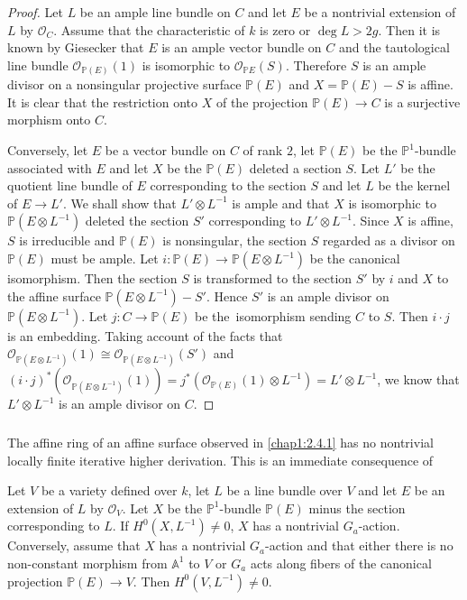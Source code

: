 \begin{proof}
Let $L$ be an ample line bundle on $C$ and let $E$ be a nontrivial
extension of $L$ by $\mathscr{O}_{C}$. Assume that the characteristic
of $k$ is zero or $\deg L>2g$. Then it is known by Giesecker \cite{15}
that $E$ is an ample vector bundle on $C$ and the tautological line
bundle $\mathscr{O}_{\mathbb{P}(E)}(1)$ is isomorphic to
$\mathscr{O}_{\mathbb{P}E}(S)$. Therefore $S$ is an ample divisor on
a nonsingular projective surface $\mathbb{P}(E)$ and
$X=\mathbb{P}(E)-S$ is affine. It is clear that the restriction onto
$X$ of the projection $\mathbb{P}(E)\to C$ is a surjective morphism
onto $C$. 

Conversely, let $E$ be a vector bundle on $C$ of rank $2$, let
$\mathbb{P}(E)$ be the $\mathbb{P}^{1}$-bundle associated with $E$ and
let $X$ be the $\mathbb{P}(E)$ deleted a section $S$. Let $L'$ be the
quotient line bundle of $E$ corresponding to the section $S$ and let
$L$ be the kernel of $E\to L'$. We shall show that $L'\otimes L^{-1}$
is ample and that $X$ is isomorphic to $\mathbb{P}(E\otimes L^{-1})$
deleted the section $S'$ corresponding to $L'\otimes L^{-1}$. Since
$X$ is affine, $S$ is irreducible and $\mathbb{P}(E)$ is nonsingular,
the section $S$ regarded as a divisor on $\mathbb{P}(E)$ must be
ample. Let $i:\mathbb{P}(E)\to \mathbb{P}(E\otimes L^{-1})$ be the
canonical isomorphism. Then the section $S$ is transformed to the
section $S'$ by $i$ and $X$ to the affine surface $\mathbb{P}(E\otimes
L^{-1})-S'$. Hence $S'$ is an ample divisor on $\mathbb{P}(E\otimes
L^{-1})$. Let $j:C\to \mathbb{P}(E)$ be the\pageoriginale\ isomorphism
sending $C$ to $S$. Then $i\cdot j$ is an embedding. Taking account of
the facts that $\mathscr{O}_{\mathbb{P}(E\otimes L^{-1})}(1)\cong
\mathscr{O}_{\mathbb{P}(E\otimes L^{-1})}(S')$ and $(i\cdot
j)^{\ast}(\mathscr{O}_{\mathbb{P}(E\otimes
  L^{-1})}(1))=j^{\ast}(\mathscr{O}_{\mathbb{P}(E)}(1)\otimes
L^{-1})=L'\otimes L^{-1}$, we know that $L'\otimes L^{-1}$ is an ample
divisor on $C$.
\end{proof}

\subsubsection{}\label{chap1:2.4.2}
The affine ring of an affine surface observed in \ref{chap1:2.4.1} has no
nontrivial locally finite iterative higher derivation. This is an
immediate consequence of

\begin{lemma*}
Let $V$ be a variety defined over $k$, let $L$ be a line bundle over
$V$ and let $E$ be an extension of $L$ by $\mathscr{O}_{V}$. Let $X$
be the $\mathbb{P}^{1}$-bundle $\mathbb{P}(E)$ minus the section
corresponding to $L$. If $H^{0}(X,L^{-1})\neq 0$, $X$ has a nontrivial
$G_{a}$-action. Conversely, assume that $X$ has a nontrivial
$G_{a}$-action and that either there is no non-constant morphism from
$\mathbb{A}^{1}$ to $V$ or $G_{a}$ acts along fibers of the canonical
projection $\mathbb{P}(E)\to V$. Then $H^{0}(V,L^{-1})\neq 0$.
\end{lemma*}

